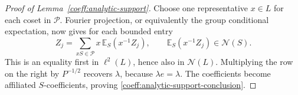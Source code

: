 \begin{proof}[Proof of Lemma~\ref{coeff:analytic-support}]
Choose one representative \(x\in L\) for each coset in \(\mathcal P\).
Fourier projection, or equivalently the group conditional expectation,
now gives for each bounded entry
\[
 Z_j=\sum_{xS\in\mathcal P}x\,\mathbb E_S(x^{-1}Z_j),
 \qquad \mathbb E_S(x^{-1}Z_j)\in\mathcal N(S).
\]
This is an equality first in \(\ell^2(L)\), hence also in
\(\mathcal N(L)\).  Multiplying the row on the right by
\(P^{-1/2}\) recovers \(\lambda\), because \(\lambda e=\lambda\).
The coefficients become affiliated \(S\)-coefficients, proving
\eqref{coeff:analytic-support-conclusion}.
\end{proof}
